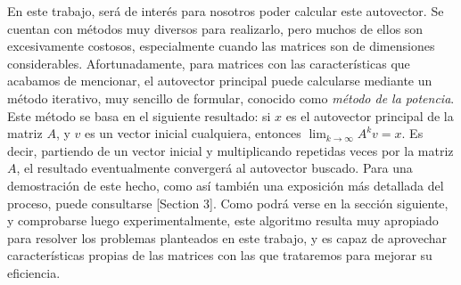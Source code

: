         En este trabajo, será de interés para nosotros poder calcular este autovector. Se cuentan con métodos muy diversos para realizarlo, pero muchos de ellos son excesivamente costosos, especialmente cuando las matrices son de dimensiones considerables. Afortunadamente, para matrices con las características que acabamos de mencionar, el autovector principal puede calcularse mediante un método iterativo, muy sencillo de formular, conocido como \emph{método de la potencia}. Este método se basa en el siguiente resultado: si $x$ es el autovector principal de la matriz $A$, y $v$ es un vector inicial cualquiera, entonces $\lim_{k\to\infty}A^k v = x$. Es decir, partiendo de un vector inicial y multiplicando repetidas veces por la matriz $A$, el resultado eventualmente convergerá al autovector buscado. Para una demostración de este hecho, como así también una exposición más detallada del proceso, puede consultarse \cite{Kamvar2003}[Section 3]. Como podrá verse en la sección siguiente, y comprobarse luego experimentalmente, este algoritmo resulta muy apropiado para resolver los problemas planteados en este trabajo, y es capaz de aprovechar características propias de las matrices con las que trataremos para mejorar su eficiencia.
